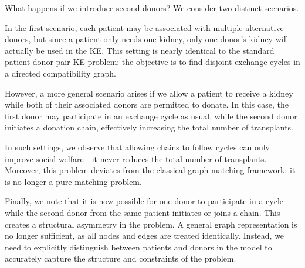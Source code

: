 
What happens if we introduce second donors? We consider two distinct scenarios.

In the first scenario, each patient may be associated with multiple alternative donors, but since a patient only needs one kidney, only one donor's kidney will actually be used in the \ac{KE}. This setting is nearly identical to the standard patient-donor pair \ac{KE} problem: the objective is to find disjoint exchange cycles in a directed compatibility graph.

However, a more general scenario arises if we allow a patient to receive a kidney while both of their associated donors are permitted to donate. In this case, the first donor may participate in an exchange cycle as usual, while the second donor initiates a donation chain, effectively increasing the total number of transplants.


In such settings, we observe that allowing chains to follow cycles can only improve social welfare—it never reduces the total number of transplants. Moreover, this problem deviates from the classical graph matching framework: it is no longer a pure matching problem.

Finally, we note that it is now possible for one donor to participate in a cycle while the second donor from the same patient initiates or joins a chain. This creates a structural asymmetry in the problem. A general graph representation is no longer sufficient, as all nodes and edges are treated identically. Instead, we need to explicitly distinguish between patients and donors in the model to accurately capture the structure and constraints of the problem.

